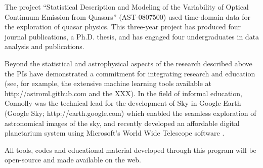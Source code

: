 The project ``Statistical Description and Modeling of the Variability
of Optical Continuum Emission from Quasars'' (AST-0807500) used
time-domain data for the exploration of quasar physics. This
three-year project has produced four journal publications, a
Ph.D. thesis, and has engaged four undergraduates in data analysis and
publications.


Beyond the statistical and astrophysical aspects of the research
described above the PIs have demonstrated a commitment for integrating
research and education (see, for example, the extensive machine
learning tools available at http://astroml.github.com and the XXX). In
the field of informal education, Connolly was the technical lead for
the development of Sky in Google Earth (Google Sky;
http://earth.google.com) which enabled the seamless exploration of
astronomical images of the sky, and recently developed an affordable
digital planetarium system using Microsoft's World Wide Telescope
software \cite{rosenfield2011}.

All tools, codes and educational material developed through this
program will be open-source and made available on the web. 

